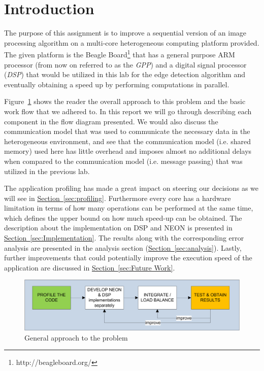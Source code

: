\section{Introduction}

The purpose of this assignment is to improve a sequential version of an image processing algorithm on a multi-core heterogeneous computing platform provided. The given platform is the Beagle Board\footnote{http://beagleboard.org/} that has a general purpose ARM processor (from now on referred to as the \emph{GPP}) and a digital signal processor (\emph{DSP}) that would be utilized in this lab for the edge detection algorithm and eventually obtaining a speed up by performing computations in parallel. 

	Figure~\ref{fig:workflow} shows the reader the overall approach to this problem and the basic work flow that we adhered to. In this report we will go through describing each component in the flow diagram presented. We would also discuss the communication model that was used to communicate the necessary data in the heterogeneous environment, and see that the communication model (i.e. shared memory) used here has little overhead and imposes almost no additional delays when compared to the communication model (i.e. message passing) that was utilized in the previous lab.

The application profiling has made a great impact on steering our decisions as we will see in \hyperref[sec:profiling]{Section~\ref{sec:profiling}}. Furthermore every core has a hardware limitation in terms of how many operations can be performed at the same time, which defines the upper bound on how much speed-up can be obtained. The description about the implementation on DSP and NEON is presented in \hyperref[sec:Implementation]{Section~\ref{sec:Implementation}}. The results along with the corresponding error analysis are presented in the analysis section (\hyperref[sec:analysis]{Section~\ref{sec:analysis}}). Lastly, further improvements that could potentially improve the execution speed of the application are discussed in \hyperref[sec:Future Work]{Section~\ref{sec:Future Work}}.

\begin{figure}
\includegraphics[width=\linewidth]{drawings/workflow}
\caption{General approach to the problem}
\label{fig:workflow}
\end{figure}


